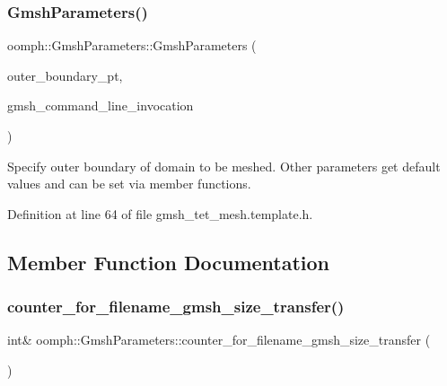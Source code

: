 \subsubsection{\texorpdfstring{Gmsh\+Parameters()}{GmshParameters()}}
{\footnotesize\ttfamily oomph\+::\+Gmsh\+Parameters\+::\+Gmsh\+Parameters (\begin{DoxyParamCaption}\item[{\hyperlink{classoomph_1_1TetMeshFacetedClosedSurface}{Tet\+Mesh\+Faceted\+Closed\+Surface} $\ast$const \&}]{outer\+\_\+boundary\+\_\+pt,  }\item[{const std\+::string \&}]{gmsh\+\_\+command\+\_\+line\+\_\+invocation }\end{DoxyParamCaption})\hspace{0.3cm}{\ttfamily [inline]}}



Specify outer boundary of domain to be meshed. Other parameters get default values and can be set via member functions. 



Definition at line 64 of file gmsh\+\_\+tet\+\_\+mesh.\+template.\+h.



\subsection{Member Function Documentation}
\mbox{\label{classoomph_1_1GmshParameters_acf8155883aab25f0fc13c1eab7c03e9c}} 
\subsubsection{\texorpdfstring{counter\+\_\+for\+\_\+filename\+\_\+gmsh\+\_\+size\+\_\+transfer()}{counter\_for\_filename\_gmsh\_size\_transfer()}}
{\footnotesize\ttfamily int\& oomph\+::\+Gmsh\+Parameters\+::counter\+\_\+for\+\_\+filename\+\_\+gmsh\+\_\+size\+\_\+transfer (\begin{DoxyParamCaption}{ }\end{DoxyParamCaption})\hspace{0.3cm}{\ttfamily [inline]}}



